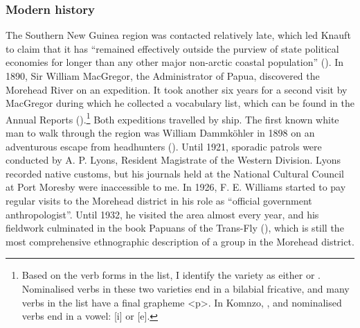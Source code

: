 \subsubsection{Modern history}\label{modernhistory}

The Southern New Guinea region was contacted relatively late, which led Knauft to claim that it has ``remained effectively outside the purview of state political economies for longer than any other major non-arctic coastal population'' (\citeyear[26]{Knauft:1993south}). In 1890, Sir William MacGregor, the Administrator of Papua, discovered the Morehead River on an expedition. It took another six years for a second visit by MacGregor during which he collected a vocabulary list, which can be found in the Annual Reports (\citealt[106]{MacGregor:1896rep}).\footnote{Based on the verb forms in the list, I identify the variety as either  or . Nominalised verbs in these two varieties end in a bilabial fricative, and many verbs in the list have a final grapheme <p>. In Komnzo, ,  and  nominalised verbs end in a vowel: [i] or [e].} Both expeditions travelled by ship. The first known white man to walk through the region was William Dammköhler in 1898 on an adventurous escape from  headhunters (\citealt{Hitchcock:2009gg}). Until 1921, sporadic patrols were conducted by A. P. Lyons, Resident Magistrate of the Western Division. Lyons recorded native customs, but his journals held at the National Cultural Council at Port Moresby were inaccessible to me. In 1926, F. E. Williams started to pay regular visits to the Morehead district in his role as ``official government anthropologist''. Until 1932, he visited the area almost every year, and his fieldwork culminated in the book Papuans of the Trans-Fly (\citealt{Williams:1936transfly}), which is still the most comprehensive ethnographic description of a group in the Morehead district.

